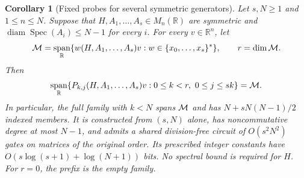 \documentclass[11pt,letterpaper]{article}
\newtheorem{corollary}[theorem]{Corollary}
\theoremstyle{definition}\newtheorem{definition}[theorem]{Definition}
\theoremstyle{remark}\newtheorem{remark}[theorem]{Remark}
\DeclareMathOperator{\spanop}{span}\DeclareMathOperator{\im}{im}
\DeclareMathOperator{\diam}{diam}\DeclareMathOperator{\Spec}{Spec}
\newcommand{\R}{\mathbb R}\newcommand{\Q}{\mathbb Q}\newcommand{\Z}{\mathbb Z}
\begin{document}
\begin{corollary}[Fixed probes for several symmetric generators]\label{cor:multi}
Let $s,N\ge1$ and $1\le n\le N$. Suppose that
$H,A_1,\ldots,A_s\in M_n(\R)$ are symmetric and
$\diam\Spec(A_i)\le N-1$ for every $i$. For every $v\in\R^n$, let
\[
\M=\spanop_\R\{w(H,A_1,\ldots,A_s)v:
                 w\in\{x_0,\ldots,x_s\}^*\},\qquad r=\dim\M.
\]
Then
\[
\spanop_\R\{P_{k,j}(H,A_1,\ldots,A_s)v:0\le k<r,\ 0\le j\le sk\}
=\M.
\]
In particular, the full family with $k<N$ spans $\mathcal M$ and has
$N+sN(N-1)/2$ indexed members. It is constructed from $(s,N)$ alone,
has noncommutative degree at most $N-1$, and admits a shared division-free
circuit of $O(s^2N^2)$ gates on matrices of the original order.
Its prescribed integer constants have
$O(s\log(s+1)+\log(N+1))$ bits. No spectral bound is required for $H$.
For $r=0$, the prefix is the empty family.
\end{corollary}
\end{document}
